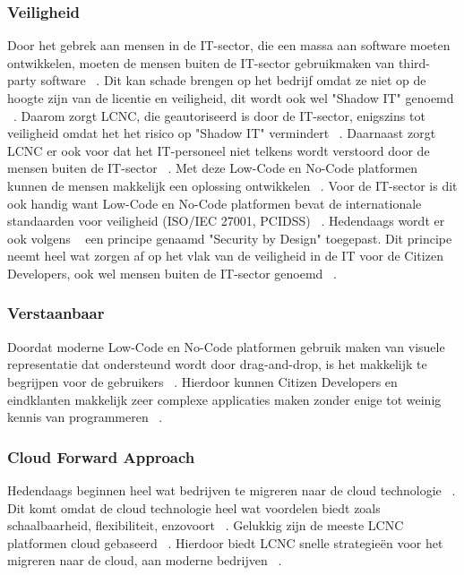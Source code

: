 \subsubsection*{Veiligheid}
\label{sub:veiligheid}
Door het gebrek aan mensen in de IT-sector, die een massa aan software moeten ontwikkelen, moeten de mensen buiten 
de IT-sector gebruikmaken van third-party software ~\autocite{Yan2021}. Dit kan schade brengen op het bedrijf omdat ze niet op de hoogte zijn 
van de licentie en veiligheid, dit wordt ook wel "Shadow IT" genoemd ~\autocite{Yan2021}. Daarom zorgt LCNC, die geautoriseerd is door de IT-sector, enigszins tot veiligheid omdat het
het risico op "Shadow IT" vermindert ~\autocite{Yan2021}. Daarnaast zorgt LCNC er ook voor dat het IT-personeel niet telkens wordt verstoord door de mensen buiten de IT-sector ~\autocite{Yan2021}.
Met deze Low-Code en No-Code platformen kunnen de mensen makkelijk een oplossing ontwikkelen ~\autocite{Yan2021}. Voor de IT-sector is dit ook handig want Low-Code en No-Code platformen bevat 
de internationale standaarden voor veiligheid (ISO/IEC 27001, PCIDSS) ~\autocite{Sufi_2023}. Hedendaags wordt er ook volgens ~\textcite{Sufi_2023} een principe genaamd "Security by Design" toegepast.
Dit principe neemt heel wat zorgen af op het vlak van de veiligheid in de IT voor de Citizen Developers,  ook wel mensen buiten de IT-sector genoemd ~\autocite{Sufi_2023}.

\subsubsection*{Verstaanbaar}
\label{sub:Verstaanbaar}
Doordat moderne Low-Code en No-Code platformen gebruik maken van visuele representatie dat ondersteund wordt door drag-and-drop, is het makkelijk te begrijpen voor de gebruikers ~\autocite{Sufi_2023}.
Hierdoor kunnen Citizen Developers en eindklanten makkelijk zeer complexe applicaties maken zonder enige tot weinig kennis van programmeren ~\autocite{Sufi_2023}.

\subsubsection*{Cloud Forward Approach}
\label{sub:cloud-forward-approach}
Hedendaags beginnen heel wat bedrijven te migreren naar de cloud technologie ~\autocite{Sufi_2023}.
Dit komt omdat de cloud technologie heel wat voordelen biedt zoals schaalbaarheid, flexibiliteit, enzovoort ~\autocite{Sufi_2023}.
Gelukkig zijn de meeste LCNC platformen cloud gebaseerd ~\autocite{Sufi_2023}. 
Hierdoor biedt LCNC snelle strategieën voor het migreren naar de cloud, aan moderne bedrijven ~\autocite{Sufi_2023}.




